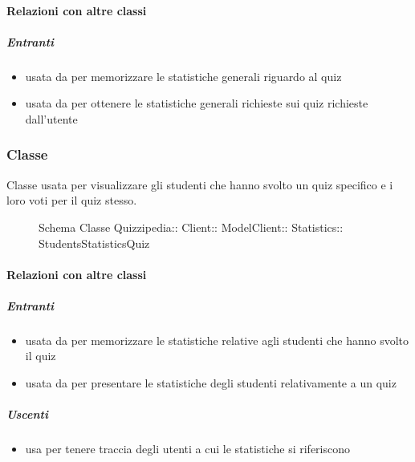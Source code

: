\paragraph{Relazioni con altre classi}
\subparagraph{Entranti}
\begin{itemize}
\item usata da  per memorizzare le statistiche generali riguardo al quiz
\item usata da  per ottenere le statistiche generali richieste sui quiz richieste dall'utente
\end{itemize}
\subsubsection{Classe }
Classe usata per visualizzare gli studenti che hanno svolto un quiz specifico e i loro voti per il quiz stesso.
\begin{figure}[H]
\centering
\noindent{}
\caption[Schema Classe StudentsStatisticsQuiz]{Schema Classe Quizzipedia:: Client:: ModelClient:: Statistics:: StudentsStatisticsQuiz}
\end{figure}
\paragraph{Relazioni con altre classi}
\subparagraph{Entranti}
\begin{itemize}
\item usata da  per memorizzare le statistiche relative agli studenti che hanno svolto il quiz
\item usata da  per presentare le statistiche degli studenti relativamente a un quiz
\end{itemize}
\subparagraph{Uscenti}
\begin{itemize}
\item usa  per tenere traccia degli utenti a cui le statistiche si riferiscono
\end{itemize}
